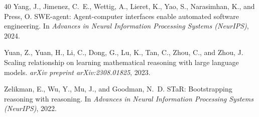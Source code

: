 \documentclass[11pt]{article}
\begin{document}
\begin{thebibliography}{40}
Yang, J., Jimenez, C.~E., Wettig, A., Lieret, K., Yao, S., Narasimhan, K.,
  and Press, O.
\newblock SWE-agent: Agent-computer interfaces enable automated software
  engineering.
\newblock In \textit{Advances in Neural Information Processing Systems
  (NeurIPS)}, 2024.

Yuan, Z., Yuan, H., Li, C., Dong, G., Lu, K., Tan, C., Zhou, C., and Zhou, J.
\newblock Scaling relationship on learning mathematical reasoning with large
  language models.
\newblock \textit{arXiv preprint arXiv:2308.01825}, 2023.

Zelikman, E., Wu, Y., Mu, J., and Goodman, N.~D.
\newblock STaR: Bootstrapping reasoning with reasoning.
\newblock In \textit{Advances in Neural Information Processing Systems
  (NeurIPS)}, 2022.

\end{thebibliography}
\end{document}
